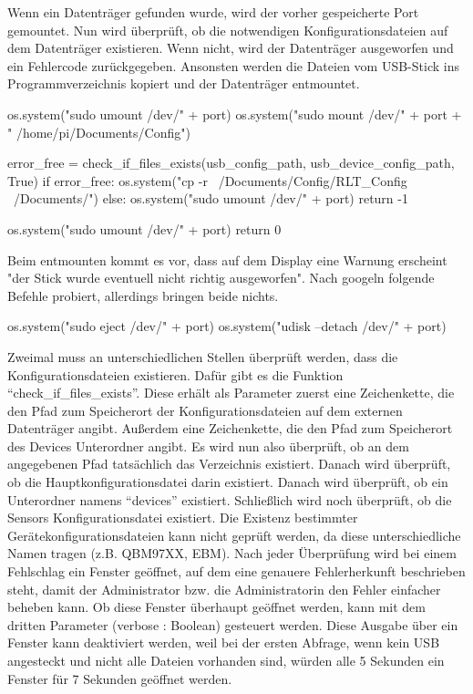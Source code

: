 Wenn ein Datenträger gefunden wurde, wird der vorher gespeicherte Port gemountet. Nun wird überprüft, ob die notwendigen Konfigurationsdateien auf dem Datenträger existieren. Wenn nicht, wird der Datenträger ausgeworfen und ein Fehlercode zurückgegeben. Ansonsten werden die Dateien vom USB-Stick ins Programmverzeichnis kopiert und der Datenträger entmountet. 
\begin{pythoncode}
	os.system("sudo umount /dev/" + port)
	os.system("sudo mount /dev/" + port + " /home/pi/Documents/Config")
	
	error_free = check_if_files_exists(usb_config_path, usb_device_config_path, True)
	if error_free:
		os.system("cp -r ~/Documents/Config/RLT_Config ~/Documents/")
	else:
		os.system("sudo umount /dev/" + port)
		return -1
		
	os.system("sudo umount /dev/" + port)
	return 0
\end{pythoncode}

Beim entmounten kommt es vor, dass auf dem Display eine Warnung erscheint "der Stick wurde eventuell nicht richtig ausgeworfen". Nach googeln folgende Befehle probiert, allerdings bringen beide nichts.
\begin{pythoncode}
	os.system("sudo eject /dev/" + port) 
	os.system("udisk --detach /dev/" + port)
\end{pythoncode}

Zweimal muss an unterschiedlichen Stellen überprüft werden, dass die Konfigurationsdateien existieren. Dafür gibt es die Funktion \enquote{check\_if\_files\_exists}. Diese erhält als Parameter zuerst eine Zeichenkette, die den Pfad zum Speicherort der Konfigurationsdateien auf dem externen Datenträger angibt. Außerdem eine Zeichenkette, die den Pfad zum Speicherort des Devices Unterordner angibt. Es wird nun also überprüft, ob an dem angegebenen Pfad tatsächlich das Verzeichnis existiert. Danach wird überprüft, ob die Hauptkonfigurationsdatei darin existiert. Danach wird überprüft, ob ein Unterordner namens \enquote{devices} existiert. Schließlich wird noch überprüft, ob die Sensors Konfigurationsdatei existiert. Die Existenz bestimmter Gerätekonfigurationsdateien kann nicht geprüft werden, da diese unterschiedliche Namen tragen (z.B. QBM97XX, EBM). Nach jeder Überprüfung wird bei einem Fehlschlag ein Fenster geöffnet, auf dem eine genauere Fehlerherkunft beschrieben steht, damit der Administrator bzw. die Administratorin den Fehler einfacher beheben kann. Ob diese Fenster überhaupt geöffnet werden, kann mit dem dritten Parameter (verbose : Boolean) gesteuert werden. Diese Ausgabe über ein Fenster kann deaktiviert werden, weil bei der ersten Abfrage, wenn kein USB angesteckt und nicht alle Dateien vorhanden sind, würden alle 5 Sekunden ein Fenster für 7 Sekunden geöffnet werden.

